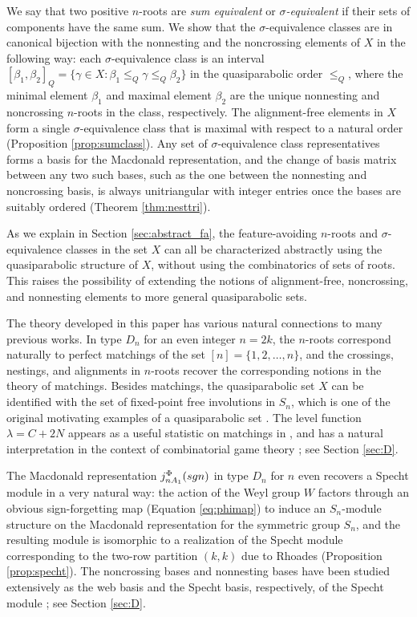 \documentclass[11pt]{amsart}
\theoremstyle{plain}
\theoremstyle{definition}
\theoremstyle{remark}
\numberwithin{equation}{subsection}
\newcommand{\be}{\beta}
\newcommand{\macd}[2]{j^{#1}_{#2}({\rm{sgn}})}
\begin{document}
We say that two positive $n$-roots are \emph{sum equivalent} or {\it
$\sigma$-equivalent} if their sets of components have the same sum. We show that
the $\sigma$-equivalence classes are in canonical bijection with the nonnesting
and the noncrossing elements of $X$ in the following way: each
$\sigma$-equivalence class is an interval $[\be_1,\be_2]_Q=\{\gamma\in
X:\beta_1\le_Q \gamma\le_Q \beta_2\}$ in the quasiparabolic
order $\le_Q$, where the minimal element $\be_1$ and maximal element $\be_2$ are
the unique nonnesting and noncrossing $n$-roots in the class, respectively. The alignment-free
elements in $X$ form a single $\sigma$-equivalence class that is maximal with
respect to a natural order (Proposition \ref{prop:sumclass}).  Any set of
$\sigma$-equivalence class representatives forms a basis for the Macdonald
representation, and the change of basis matrix between any two such bases, such
as the one between the nonnesting and noncrossing basis, is always unitriangular
with integer entries once the bases are suitably ordered (Theorem \ref{thm:nesttri}).

As we explain in Section \ref{sec:abstract_fa}, the feature-avoiding $n$-roots
and $\sigma$-equivalence classes in the set $X$ can all be characterized
abstractly using the quasiparabolic structure of $X$, without using the
combinatorics of sets of roots.  This raises
the possibility of extending the notions of alignment-free, noncrossing, and
nonnesting elements to more general quasiparabolic sets.

The theory developed in this paper has various natural connections to many
previous works. In type $D_n$ for an even integer $n=2k$, the $n$-roots
correspond naturally to perfect matchings of the set $[n]=\{1,2,\dots,n\}$, and
the crossings, nestings, and alignments in $n$-roots recover the corresponding
notions in the theory of matchings.  Besides matchings, the quasiparabolic set
$X$ can be identified with the set of fixed-point free involutions in $S_n$,
which is one of the original motivating examples of a quasiparabolic set
\cite[Section 4]{rains13}.  The level function $\lambda=C+2N$ appears as a
useful statistic on matchings in \cite{simion96,diaz09,cheon15}, and has a
natural interpretation in the context of combinatorial game theory
\cite{irie21}; see Section \ref{sec:D}.

The Macdonald representation $\macd{\Phi}{nA_1}$ in type $D_n$ for $n$ even
recovers a Specht module in a very natural way: the action of the Weyl group $W$
factors through an obvious sign-forgetting map (Equation \eqref{eq:phimap}) to
induce an $S_n$-module structure on the Macdonald representation for the
symmetric group $S_n$, and the resulting module is isomorphic to a realization
of the Specht module corresponding to the two-row partition $(k,k)$ due to
Rhoades \cite{rhoades17} (Proposition \ref{prop:specht}). The noncrossing bases
and nonnesting bases have been studied extensively as the web basis and the
Specht basis, respectively, of the Specht module
\cite{russell19,im22,hwang23,kujawa24}; see Section \ref{sec:D}.
\end{document}
